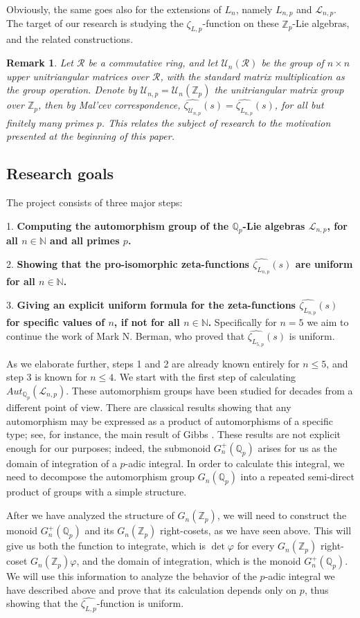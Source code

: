 \documentclass[12pt]{article}
\newtheorem{remark}[theorem]{Remark}
\begin{document}
Obviously, the same goes also for the extensions of $L_n$, namely $L_{n,p}$ and $\mathcal{L}_{n,p}$. The target of our research is studying the $\hat{\zeta_{L,p}}$-function on these $\mathbb{Z}_p$-Lie algebras, and the related constructions.
\begin{remark}
Let $\mathcal{R}$ be a commutative ring, and let $\mathcal{U}_n(\mathcal{R})$ be the group of $n\times{n}$ upper unitriangular matrices over $\mathcal{R}$, with the standard matrix multiplication as the group operation. Denote by $\mathcal{U}_{n,p}=\mathcal{U}_n(\mathbb{Z}_p)$ the unitriangular matrix group over $\mathbb{Z}_p$, then by Mal'cev correspondence, $\hat{\zeta_{\mathcal{U}_{n,p}}}(s)=\hat{\zeta_{L_{n,p}}}(s)$, for all but finitely many primes $p$. This relates the subject of research to the motivation presented at the beginning of this paper.
\end{remark}
\subsection{Research goals}
The project consists of three major steps:\par
1. \textbf{Computing the automorphism group of the $\mathbb{Q}_p$-Lie algebras $\mathcal{L}_{n,p}$, for all $n\in\mathbb{N}$ and all primes $p$.}\par
2. \textbf{Showing that the pro-isomorphic zeta-functions $\hat{\zeta_{L_{n,p}}}(s)$ are uniform for all $n\in\mathbb{N}$.}\par
3. \textbf{Giving an explicit uniform formula for the zeta-functions $\hat{\zeta_{L_{n,p}}}(s)$ for specific values of $n$, if not for all $n\in\mathbb{N}$.}
Specifically for $n=5$ we aim to continue the work of Mark N. Berman, who proved that $\hat{\zeta_{L_{5,p}}}(s)$ is uniform.\par
As we elaborate further, steps 1 and 2 are already known entirely for $n\leq 5$, and step 3 is known for $n\leq 4$.
We start with the first step of calculating $Aut_{\mathbb{Q}_p}(\mathcal{L}_{n,p})$. These automorphism groups have been studied for decades from a different point of view.  There are classical results showing that any automorphism may be expressed as a product of automorphisms of a specific type; see, for instance, the main result of Gibbs \cite{Gibbs}.  These results are not explicit enough for our purposes; indeed, the submonoid $G_n^+(\mathbb{Q}_p)$ arises for us as the domain of integration of a $p$-adic integral.  In order to calculate this integral, we need to decompose the automorphism group $G_n(\mathbb{Q}_p)$ into a repeated semi-direct product of groups with a simple structure.
\par
After we have analyzed the structure of $G_n(\mathbb{Z}_p)$, we will need to construct the monoid $G_n^+(\mathbb{Q}_p)$ and its $G_n(\mathbb{Z}_p)$ right-cosets, as we have seen above. This will give us both the function to integrate, which is $\det\varphi$ for every $G_n(\mathbb{Z}_p)$ right-coset $G_n(\mathbb{Z}_p)\varphi$, and the domain of integration, which is the monoid $G_n^+(\mathbb{Q}_p)$. We will use this information to analyze the behavior of the $p$-adic integral we have described above and prove that its calculation depends only on $p$, thus showing that the $\hat{\zeta_{L,p}}$-function is uniform.
\end{document}
